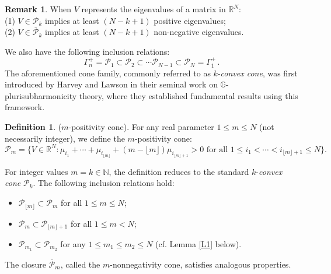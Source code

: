 \documentclass[12pt, twoside]{article}
\theoremstyle{definition}
\newtheorem{definition}[theorem]{Definition}
\newtheorem{remark}[theorem]{Remark}
\numberwithin{equation}{section}
\begin{document}
\begin{remark}
When $V$ represents the eigenvalues of a matrix in $\mathbb{R}^N$:\\
(1) $V\in\mathcal{P}_{k}$ implies at least $(N-k+1)$ positive eigenvalues;\\
(2) $V\in\overline{\mathcal{P}}_{k}$ implies at least $(N-k+1)$ non-negative eigenvalues.
\end{remark}
We also have the following inclusion relations:
\begin{equation}\label{P inclusion}
\Gamma^{+}_{n}=\mathcal{P}_{1}\subset \mathcal{P}_{2}\subset \cdots \mathcal{P}_{N-1}\subset \mathcal{P}_{N}=\Gamma^{+}_{1}\,.
\end{equation}
The aforementioned cone family, commonly referred to as $k$-\textit{convex cone}, was first introduced by Harvey and Lawson \cite{HL13} in their seminal work on $\mathbb{G}$-plurisubharmonicity theory, where they established fundamental results using this framework.
\begin{definition}\label{Pm}
($m$-positivity cone).
For any real parameter $1\leq m\leq N$ (not necessarily integer), we define the $m$-positivity cone:
$$\mathcal{P}_{m}=\{V\in \mathbb{R}^N :  \mu_{i_1}+\cdots +\mu_{i_{ \lfloor m\rfloor}}+(m-\lfloor m\rfloor)\mu_{i_{\lfloor m\rfloor+1}}>0 \textrm{ for all }  1\leq i_1<\cdots< i_{\lfloor m\rfloor+1}\leq N\}.$$
\end{definition}
For integer values $m=k\in\mathbb{N}$, the definition reduces to the standard $k$-\textit{convex cone} $\mathcal{P}_{k}$. The following inclusion relations hold:
\begin{itemize}
\item[(i)]  $\mathcal{P}_{\lfloor m\rfloor}\subset \mathcal{P}_{m}$ for all $1\leq m\leq N$;
\item[(ii)]  $\mathcal{P}_{m}\subset \mathcal{P}_{\lfloor m\rfloor+1}$ for all $1\leq m<N$;
\item[(iii)] $\mathcal{P}_{m_{1}}\subset\mathcal{P}_{m_{2}}$ for any $1\leq m_{1}\leq m_{2}\leq N$ (cf. Lemma \ref{L1} below).
\end{itemize}
The closure $\overline{\mathcal{P}}_{m}$, called the $m$-nonnegativity cone, satisfies analogous properties.
\end{document}
